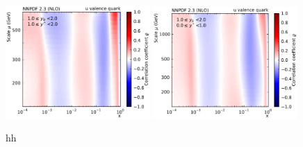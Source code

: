 \begin{figure}[htbp]
    \includegraphics[width=0.49\textwidth]{figures/pdf_constraints/corr_PTMAXEXPYS_YBYS_NLO_FINALBINS_NNPDF23_u_valence_quark_ys1_0yb1_0_cl.pdf}\hfill
    \includegraphics[width=0.49\textwidth]{figures/pdf_constraints/corr_PTMAXEXPYS_YBYS_NLO_FINALBINS_NNPDF23_u_valence_quark_ys0_0yb0_0_cl.pdf}\hfill
    \caption{}hh
    \label{fig:pdfconstraints_gluon}
\end{figure}

